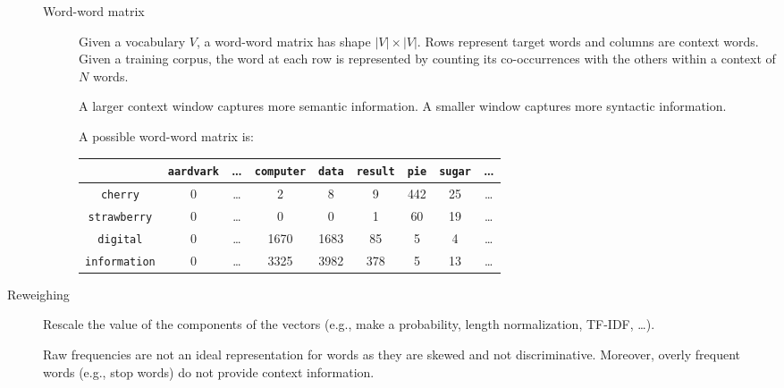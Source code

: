 \begin{description}
\begin{description}
            \item[Word-word matrix] 
                Given a vocabulary $V$, a word-word matrix has shape $|V| \times |V|$. Rows represent target words and columns are context words.
                Given a training corpus, the word at each row is represented by counting its co-occurrences with the others within a context of $N$ words.

                \begin{remark}
                    A larger context window captures more semantic information. A smaller window captures more syntactic information.
                \end{remark}

                \begin{example}
                    A possible word-word matrix is:
                    \begin{table}[H]
                        \centering
                        \footnotesize
                        \begin{tabular}{ccccccccc}
                            \toprule
                            & \texttt{aardvark} & \dots & \texttt{computer} & \texttt{data} & \texttt{result} & \texttt{pie} & \texttt{sugar} & \dots \\
                            \midrule
                            \texttt{cherry} & 0 & \dots & 2 & 8 & 9 & 442 & 25 & \dots \\
                            \texttt{strawberry} & 0 & \dots & 0 & 0 & 1 & 60 & 19 & \dots \\
                            \texttt{digital} & 0 & \dots & 1670 & 1683 & 85 & 5 & 4 & \dots \\
                            \texttt{information} & 0 & \dots & 3325 & 3982 & 378 & 5 & 13 & \dots \\
                            \bottomrule
                        \end{tabular}
                    \end{table}
                \end{example}
        \end{description}

    \item[Reweighing] 
        Rescale the value of the components of the vectors (e.g., make a probability, length normalization, TF-IDF, \dots).

        \begin{remark}
            Raw frequencies are not an ideal representation for words as they are skewed and not discriminative. Moreover, overly frequent words (e.g., stop words) do not provide context information.
        \end{remark}


\end{description}
